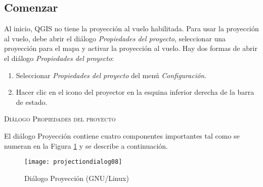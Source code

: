 
\subsection{Comenzar}\label{label_projstart}

Al inicio, QGIS no tiene la proyección al vuelo habilitada. Para usar la proyección al vuelo, debe abrir el diálogo \textit{Propiedades del proyecto}, seleccionar una proyección para el mapa y activar la proyección al vuelo. Hay dos formas de abrir el diálogo \textit{Propiedades del proyecto}:

\begin{enumerate}
\item Seleccionar \textit{Propiedades del proyecto} del menú \textit{Configuración}.
\item Hacer clic en el icono del proyector en la esquina inferior derecha de la barra de estado.
\end{enumerate}

\begin{Tip}
 \caption{\textsc{Diálogo Propiedades del proyecto}}
\end{Tip}

El diálogo Proyección contiene cuatro componentes importantes tal como se numeran en la Figura \ref{fig:projections} y se describe a continuación.

\begin{figure}[ht]
   \begin{center}
   \caption{Diálogo Proyección (GNU/Linux)}\label{fig:projections}\smallskip
   \texttt{[image: projectiondialog08]}
\end{center}  
\end{figure}

